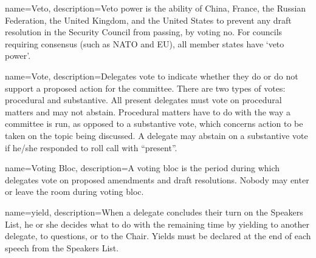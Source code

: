 {
	name={Veto},
	description={Veto power is the ability of China, France, the Russian Federation, the United Kingdom, and the United States to prevent any draft resolution in the Security Council from passing, by voting no. For councils requiring consensus (such as NATO and EU), all member states have `veto power'.}
}

{
	name={Vote},
	description={Delegates vote to indicate whether they do or do not support a proposed action for the committee. There are two types of votes: procedural and substantive. All present delegates must vote on procedural matters and may not abstain. Procedural matters have to do with the way a committee is run, as opposed to a substantive vote, which concerns action to be taken on the topic being discussed. A delegate may abstain on a substantive vote if he/she responded to roll call with ``present''.}
}

{
	name={Voting Bloc},
	description={A voting bloc is the period during which delegates vote on proposed amendments and draft resolutions. Nobody may enter or leave the room during voting bloc.}
}

{
	name={yield},
	description={When a delegate concludes their turn on the Speakers List, he or she decides what to do with the remaining time by yielding to another delegate, to questions, or to the Chair. Yields must be declared at the end of each speech from the Speakers List.}
}

